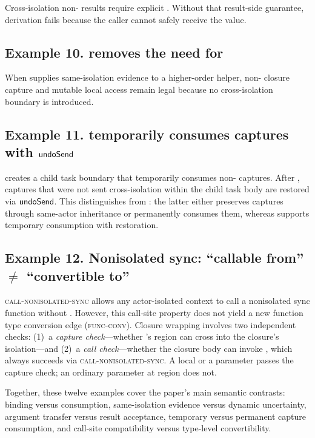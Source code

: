 Cross-isolation non- results require explicit . Without that result-side guarantee, derivation fails because the caller cannot safely receive the value.


\subsection{Example 10.  removes the need for }

When  supplies same-isolation evidence to a higher-order helper, non- closure capture and mutable local access remain legal because no cross-isolation boundary is introduced.


\subsection{Example 11.  temporarily consumes captures with $\textsf{undoSend}$}

 creates a child task boundary that temporarily consumes non- captures. After , captures that were not sent cross-isolation within the child task body are restored via $\textsf{undoSend}$. This distinguishes  from : the latter either preserves captures through same-actor inheritance or permanently consumes them, whereas  supports temporary consumption with restoration.

\subsection{Example 12. Nonisolated sync: ``callable from'' $\neq$ ``convertible to''}

\textsc{call-nonisolated-sync} allows any actor-isolated context to call a nonisolated sync function without . However, this call-site property does not yield a new function type conversion edge (\textsc{func-conv}). Closure wrapping  involves two independent checks: (1)~a \emph{capture check}---whether 's region can cross into the closure's isolation---and (2)~a \emph{call check}---whether the closure body can invoke , which always succeeds via \textsc{call-nonisolated-sync}. A \disconnected{} local or a \sending{} parameter passes the capture check; an ordinary parameter at \task{} region does not.


Together, these twelve examples cover the paper's main semantic contrasts: binding versus consumption, same-isolation evidence versus dynamic uncertainty, argument transfer versus result acceptance, temporary versus permanent capture consumption, and call-site compatibility versus type-level convertibility.
